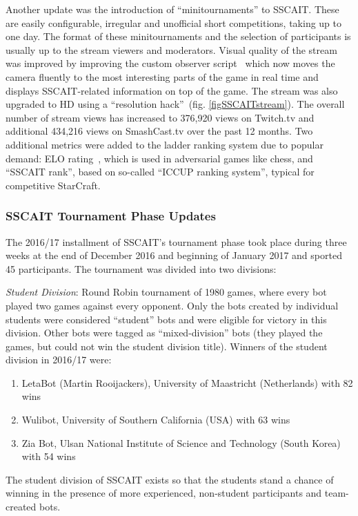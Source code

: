 Another update was the introduction of ``minitournaments'' to SSCAIT. These are easily configurable, irregular and unofficial short competitions, taking up to one day. The format of these minitournaments and the selection of participants is usually up to the stream viewers and moderators. Visual quality of the stream was improved by improving the custom observer script~\cite{mattsson2015automatic} which now moves the camera fluently to the most interesting parts of the game in real time and displays SSCAIT-related information on top of the game. The stream was also upgraded to HD using a ``resolution hack''~(fig. \ref{figSSCAITstream}). 
The overall number of stream views has increased to 376,920 views on Twitch.tv and additional 434,216 views on SmashCast.tv over the past 12 months. Two additional metrics were added to the ladder ranking system due to popular demand: ELO rating~\cite{elo1978rating}, which is used in adversarial games like chess, and ``SSCAIT rank'', based on so-called ``ICCUP ranking system'', typical for competitive StarCraft.

\subsubsection*{SSCAIT Tournament Phase Updates}

The 2016/17 installment of SSCAIT's tournament phase took place during three weeks at the end of December 2016 and beginning of January 2017 and sported 45 participants. The tournament was divided into two divisions:

\emph{Student Division}: Round Robin tournament of 1980 games, where every bot played two games against every opponent. Only the bots created by individual students were considered ``student'' bots and were eligible for victory in this division. Other bots were tagged as ``mixed-division'' bots (they played the games, but could not win the student division title). Winners of the student division in 2016/17 were:
  \begin{enumerate}
	\item LetaBot (Martin Rooijackers), University of Maastricht (Netherlands) with 82 wins
	\item Wulibot, University of Southern California (USA) with 63 wins
	\item Zia Bot, Ulsan National Institute of Science and Technology (South Korea) with 54 wins
  \end{enumerate}
The student division of SSCAIT exists so that the students stand a chance of winning in the presence of more experienced, non-student participants and team-created bots.


